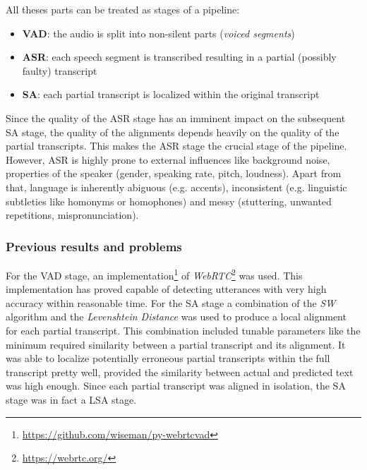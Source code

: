 All theses parts can be treated as stages of a pipeline:

\begin{itemize}
	\item \textbf{\ac{VAD}}: the audio is split into non-silent parts (\textit{voiced segments})
	\item \textbf{\ac{ASR}}: each speech segment is transcribed resulting in a partial (possibly faulty) transcript
	\item \textbf{\ac{SA}}: each partial transcript is localized within the original transcript	
\end{itemize}

Since the quality of the \ac{ASR} stage has an imminent impact on the subsequent \ac{SA} stage, the quality of the alignments depends heavily on the quality of the partial transcripts. This makes the \ac{ASR} stage the crucial stage of the pipeline. However, \ac{ASR} is highly prone to external influences like background noise, properties of the speaker (gender, speaking rate, pitch, loudness). Apart from that, language is inherently abiguous (e.g. accents), inconsistent (e.g. linguistic subtleties like homonyms or homophones) and messy (stuttering, unwanted repetitions, mispronunciation).

\subsubsection{Previous results and problems}
For the \ac{VAD} stage, an implementation\footnote{\url{https://github.com/wiseman/py-webrtcvad}} of \textit{WebRTC}\footnote{\url{https://webrtc.org/}} was used. This implementation has proved capable of detecting utterances with very high accuracy within reasonable time. For the \ac{SA} stage a combination of the \textit{\ac{SW}} algorithm and the \textit{Levenshtein Distance} was used to produce a local alignment for each partial transcript. This combination included tunable parameters like the minimum required similarity between a partial transcript and its alignment. It was able to localize potentially erroneous partial transcripts within the full transcript pretty well, provided the similarity between actual and predicted text was high enough. Since each partial transcript was aligned in isolation, the \ac{SA} stage was in fact a \ac{LSA} stage. 

